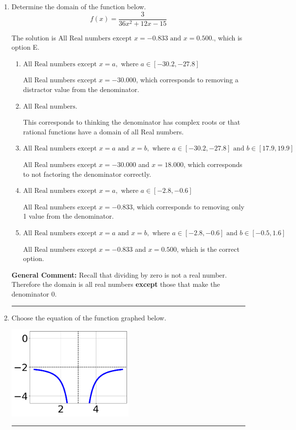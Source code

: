 \documentclass{extbook}[14pt]
\newcommand{\litem}[1]{\item #1

\rule{\textwidth}{0.4pt}}
\begin{document}
\begin{enumerate}\litem{
Determine the domain of the function below.
\[ f(x) = \frac{3}{36x^{2} +12 x -15} \]

The solution is \( \text{All Real numbers except } x = -0.833 \text{ and } x = 0.500. \), which is option E.\begin{enumerate}[label=\Alph*.]
\item \( \text{All Real numbers except } x = a, \text{ where } a \in [-30.2, -27.8] \)

All Real numbers except $x = -30.000$, which corresponds to removing a distractor value from the denominator.
\item \( \text{All Real numbers.} \)

This corresponds to thinking the denominator has complex roots or that rational functions have a domain of all Real numbers.
\item \( \text{All Real numbers except } x = a \text{ and } x = b, \text{ where } a \in [-30.2, -27.8] \text{ and } b \in [17.9, 19.9] \)

All Real numbers except $x = -30.000$ and $x = 18.000$, which corresponds to not factoring the denominator correctly.
\item \( \text{All Real numbers except } x = a, \text{ where } a \in [-2.8, -0.6] \)

All Real numbers except $x = -0.833$, which corresponds to removing only 1 value from the denominator.
\item \( \text{All Real numbers except } x = a \text{ and } x = b, \text{ where } a \in [-2.8, -0.6] \text{ and } b \in [-0.5, 1.6] \)

All Real numbers except $x = -0.833$ and $x = 0.500$, which is the correct option.
\end{enumerate}

\textbf{General Comment:} Recall that dividing by zero is not a real number. Therefore the domain is all real numbers \textbf{except} those that make the denominator 0.
}
\litem{
Choose the equation of the function graphed below.

\begin{center}
    \includegraphics[width=0.5\textwidth]{../Figures/rationalGraphToEquationA.png}
\end{center}




}
\end{enumerate}
\end{document}
